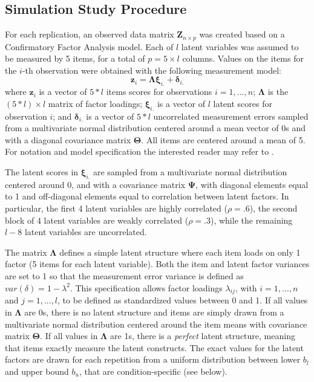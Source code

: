 \FloatBarrier %

\subsection{Simulation Study Procedure}

	For each replication, an observed data matrix $\bm{Z}_{n \times p}$ was created based on a Confirmatory 
	Factor Analysis model.
	Each of $l$ latent variables was assumed to be measured by 5 items, for a total of $p = 5 \times l$ 
	columns.
	Values on the items for the $i$-th observation were obtained with the following measurement 
	model:
%
	\begin{equation}
		\bm{z}_i = \bm{\Lambda} \bm{\xi}_{i.} + \bm{\delta}_{i.}
	\end{equation}
%
	where $\bm{z}_i$ is a vector of $5*l$ items scores for observations $i = 1, ..., n$;
	$\bm{\Lambda}$ is the $(5*l) \times l$ matrix of factor loadings; $\bm{\xi}_{i.}$ is a vector of $l$ latent scores 
	for observation $i$; and $\bm{\delta}_{i.}$ is a vector of $5*l$ uncorrelated measurement errors sampled from a 
	multivariate normal distribution centered around a mean vector of 0s and with a diagonal covariance matrix $\bm{\Theta}$.
	All items are centered around a mean of 5.
	For notation and model specification the interested reader may refer to \cite{bollen:1989}.

	The latent scores in $\bm{\xi}_{i.}$ are sampled from a multivariate normal distribution centered around 
	0, and with a covariance matrix $\bm{\Psi}$, with diagonal elements equal to 1 and off-diagonal elements 
	equal to correlation between latent factors. 
	In particular, the first 4 latent variables are highly correlated ($\rho = .6$), the second block of 4 
	latent variables are weakly correlated ($\rho = .3$), while the remaining $l-8$ latent variables are 
	uncorrelated.

	The matrix $\bm{\Lambda}$ defines a simple latent structure where each item loads on only 1 factor (5 items 
	for each latent variable).
	Both the item and latent factor variances are set to 1 so that the measurement error variance is defined as 
	$var(\delta) = 1 - \lambda^{2}$.
	This specification allows factor loadings $\lambda_{ij}$, with $i = 1, ..., n$ and $j = 1, ..., l$, to be
	defined as standardized values between 0 and 1.
	If all values in $\bm{\Lambda}$ are 0s, there is no latent structure and items are simply drawn from a
	multivariate normal distribution centered around the item means with covariance matrix $\bm{\Theta}$.
	If all values in $\bm{\Lambda}$ are 1s, there is a \emph{perfect} latent structure, meaning that items
	exactly measure the latent constructs.
	The exact values for the latent factors are drawn for each repetition from a uniform distribution between
	lower $b_l$ and upper bound $b_u$, that are condition-specific (see below).


